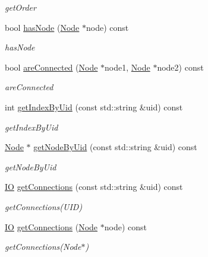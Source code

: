 \begin{DoxyCompactItemize}
\begin{DoxyCompactList}\small\item\em get\+Order \end{DoxyCompactList}\item 
bool \mbox{\hyperlink{class_graph_a45c6a79b3251a56674cbabf980f8cea7}{has\+Node}} (\mbox{\hyperlink{class_node}{Node}} $\ast$node) const
\begin{DoxyCompactList}\small\item\em has\+Node \end{DoxyCompactList}\item 
bool \mbox{\hyperlink{class_graph_af392b6a490dee43fb2448b2d969353b0}{are\+Connected}} (\mbox{\hyperlink{class_node}{Node}} $\ast$node1, \mbox{\hyperlink{class_node}{Node}} $\ast$node2) const
\begin{DoxyCompactList}\small\item\em are\+Connected \end{DoxyCompactList}\item 
int \mbox{\hyperlink{class_graph_a2d8d8d9edb8a496d5c252132cdbbbc08}{get\+Index\+By\+Uid}} (const std\+::string \&uid) const
\begin{DoxyCompactList}\small\item\em get\+Index\+By\+Uid \end{DoxyCompactList}\item 
\mbox{\hyperlink{class_node}{Node}} $\ast$ \mbox{\hyperlink{class_graph_a6f882885bf6f2c1b492985263a45d2b1}{get\+Node\+By\+Uid}} (const std\+::string \&uid) const
\begin{DoxyCompactList}\small\item\em get\+Node\+By\+Uid \end{DoxyCompactList}\item 
\mbox{\hyperlink{_graph_8h_a383232190011cffd7d1fb05d72e89928}{IO}} \mbox{\hyperlink{class_graph_a163656854e289f8dbdf037683d581dec}{get\+Connections}} (const std\+::string \&uid) const
\begin{DoxyCompactList}\small\item\em get\+Connections(\+U\+I\+D) \end{DoxyCompactList}\item 
\mbox{\hyperlink{_graph_8h_a383232190011cffd7d1fb05d72e89928}{IO}} \mbox{\hyperlink{class_graph_ac925af39108ceec409a3083bc784604e}{get\+Connections}} (\mbox{\hyperlink{class_node}{Node}} $\ast$node) const
\begin{DoxyCompactList}\small\item\em get\+Connections(\+Node$\ast$) \end{DoxyCompactList}\item 

\end{DoxyCompactItemize}
